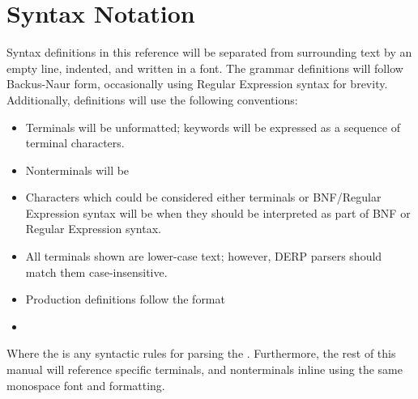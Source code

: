 \section{Syntax Notation}
Syntax definitions in this reference will be separated from surrounding text by an empty line,
indented, and written in a  font. The grammar definitions will follow Backus-Naur form,
occasionally using Regular Expression syntax for brevity. Additionally, definitions will use the following conventions:

\begin{itemize}
\item Terminals will be unformatted; keywords will be expressed as a sequence of terminal characters.
\item Nonterminals will be 
\item Characters which could be considered either terminals or BNF/Regular Expression syntax will be  when they should be interpreted as part of BNF or Regular Expression syntax.
\item All terminals shown are lower-case text; however, DERP parsers should match them case-insensitive.
\item Production definitions follow the format
\end{itemize}

\begin{itemize}[leftmargin=1.5in]
    \item[\nonterminal{nonterminal}] \bnf{:} 
\end{itemize}

Where the  is any syntactic rules for parsing the .
Furthermore,  the rest of this manual will reference specific terminals, and nonterminals inline using the same monospace font and formatting.
